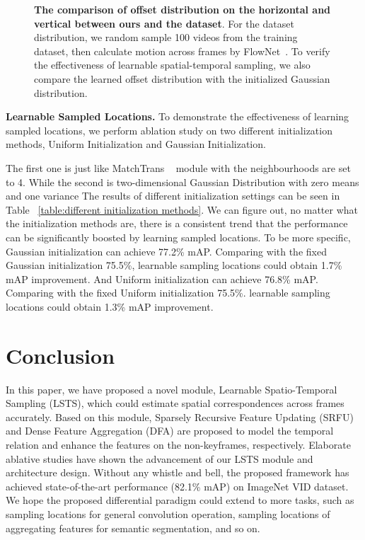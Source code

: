 \documentclass[runningheads]{llncs}
\begin{document}
\begin{figure}[t]
\centering
{}\caption{
\textbf{The comparison of offset distribution on the horizontal and vertical between ours and the dataset}. For the dataset distribution, we random sample 100 videos from the training dataset, then calculate motion across frames by FlowNet~\cite{dosovitskiy2015flownet}. To verify the effectiveness of learnable spatial-temporal sampling, we also compare the learned offset distribution with the initialized Gaussian distribution.}
\label{offset-distribution}
\end{figure}


\noindent \textbf{Learnable Sampled Locations.}
To demonstrate the effectiveness of learning sampled locations, we perform ablation study on two different initialization methods, Uniform Initialization and Gaussian Initialization. 

The first one is just like MatchTrans ~\cite{xiao2018video} module with the neighbourhoods are set to 4. While the second is two-dimensional Gaussian Distribution with zero means and one variance
The results of different initialization settings can be seen in Table ~\ref{table:different initialization methods}. We can figure out, no matter what the initialization methods are, there is a consistent trend that the performance can be significantly boosted by learning sampled locations. To be more specific, Gaussian initialization can achieve 77.2\% mAP. Comparing with the fixed Gaussian initialization 75.5\%, learnable sampling locations could obtain 1.7\% mAP improvement. And Uniform initialization can achieve 76.8\% mAP.  Comparing with the fixed Uniform initialization 75.5\%. learnable sampling locations could obtain 1.3\% mAP improvement. 



\section{Conclusion}
In this paper, we have proposed a novel module, Learnable Spatio-Temporal Sampling (LSTS), which could estimate spatial correspondences across frames accurately. Based on this module, Sparsely Recursive Feature Updating (SRFU) and Dense Feature Aggregation (DFA) are proposed to model the temporal relation and enhance the features on the non-keyframes, respectively. Elaborate ablative studies have shown the advancement of our LSTS module and architecture design. Without any whistle and bell, the proposed framework has achieved state-of-the-art performance (82.1\% mAP) on ImageNet VID dataset. We hope the proposed differential paradigm could extend to more tasks, such as sampling locations for general convolution operation, sampling locations of aggregating features for semantic segmentation, and so on. 
\end{document}
